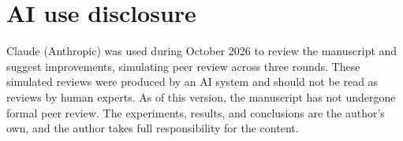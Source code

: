 \documentclass[11pt,a4paper]{article}
\begin{document}
\section*{AI use disclosure}
Claude (Anthropic) was used during October 2026 to review the manuscript and suggest improvements, simulating peer review across three rounds. These simulated reviews were produced by an AI system and should not be read as reviews by human experts. As of this version, the manuscript has not undergone formal peer review. The experiments, results, and conclusions are the author's own, and the author takes full responsibility for the content.

\clearpage
\printbibliography[heading=bibintoc]

\clearpage
\appendix
\end{document}

